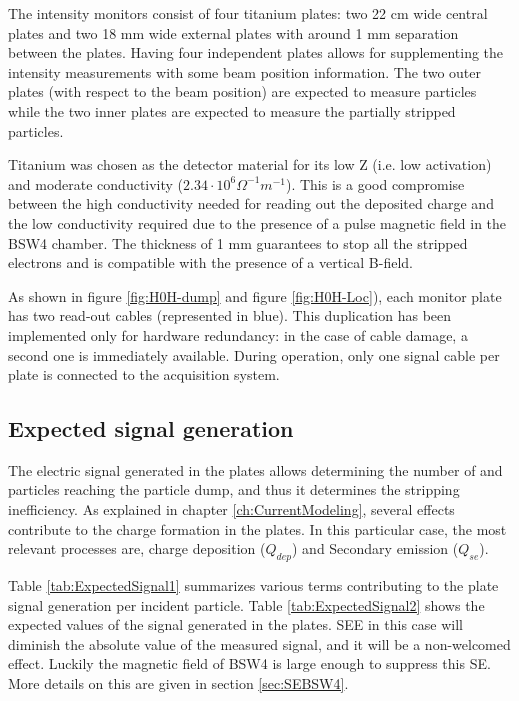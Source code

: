 The \hzhm intensity monitors consist of four titanium plates: two 22 cm wide central plates and two 18 mm wide external plates with around 1 mm separation between the plates. Having four independent plates allows for supplementing the intensity measurements with some beam position information. The two outer plates (with respect to the beam position) are expected to measure \hm particles while the two inner plates are expected to measure the partially stripped \hzz particles. 

Titanium was chosen as the detector material for its low Z (i.e. low activation) and moderate conductivity ($2.34\cdot 10^6 \Omega^{-1} m^{-1}$). This is a good compromise between the high conductivity needed for reading out the deposited charge and the low conductivity required due to the presence of a pulse magnetic field in the BSW4 chamber. The thickness of 1 mm guarantees to stop all the stripped electrons and is compatible with the presence of a vertical B-field. 

As shown in figure \ref{fig:H0H-dump} and figure \ref{fig:H0H-Loc}), each monitor plate has two read-out cables (represented in blue). This duplication has been implemented only for hardware redundancy: in the case of cable damage, a second one is immediately available. During operation, only one signal cable per plate is connected to the acquisition system.

\subsection{Expected signal generation}

The electric signal generated in the plates allows determining the number of \hzz and \hm particles reaching the particle dump, and thus it determines the stripping inefficiency. As explained in chapter \ref{ch:CurrentModeling}, several effects contribute to the charge formation in the plates. In this particular case, the most relevant processes are, charge deposition ($Q_{dep}$) and Secondary emission ($Q_{se}$). 

Table \ref{tab:ExpectedSignal1} summarizes various terms contributing to the plate signal generation per incident particle. Table \ref{tab:ExpectedSignal2} shows the expected values of the signal generated in the \hzhm plates. SEE in this case will diminish the absolute value of the measured signal, and it will be a non-welcomed effect.  Luckily the magnetic field of BSW4 is large enough to suppress this SE. 
More details on this are given in section \ref{sec:SEBSW4}.

